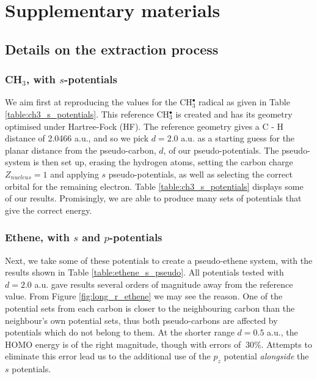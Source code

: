 \documentclass[aip]{revtex4-1}
\begin{document}


\clearpage
\section{Supplementary materials}
\subsection{Details on the extraction process}
\subsubsection{CH\(_{3}\), with \(s\)-potentials}

We aim first at reproducing the values for the CH\(^{\bullet}_{3}\) radical as given in Table \ref{table:ch3_s_potentials}. 
This reference CH\(^{\bullet}_{3}\) is created and has its geometry optimised under Hartree-Fock (HF). The reference geometry gives a C - H distance of 2.0466 a.u., and so we pick \(d = 2.0\) a.u. as a starting guess for the planar distance from the pseudo-carbon, \(d\), of our pseudo-potentials. The pseudo-system is then set up, erasing the hydrogen atoms, setting the carbon charge \(Z_{nucleus} = 1\) and applying \(s\) pseudo-potentials, as well as selecting the correct orbital for the remaining electron. Table \ref{table:ch3_s_potentials} displays some of our results. Promisingly, we are able to produce many sets of potentials that give the correct energy.

\subsubsection{Ethene, with \(s\) and \(p\)-potentials}

Next, we take some of these potentials to create a pseudo-ethene system, with the results shown in Table \ref{table:ethene_s_pseudo}. All potentials tested with \(d = 2.0\) a.u. gave results several orders of magnitude away from the reference value. From Figure \ref{fig:long_r_ethene} we may see the reason. One of the potential sets from each carbon is closer to the neighbouring carbon than the neighbour's own potential sets, thus both pseudo-carbons are affected by potentials which do not belong to them. At the shorter range \(d = 0.5\) a.u., the HOMO energy is of the right magnitude, though with errors of \(~ 30\%\). Attempts to eliminate this error lead us to the additional use of the \(p_{z}\) potential \textit{alongside} the \(s\) potentials.
\end{document}
